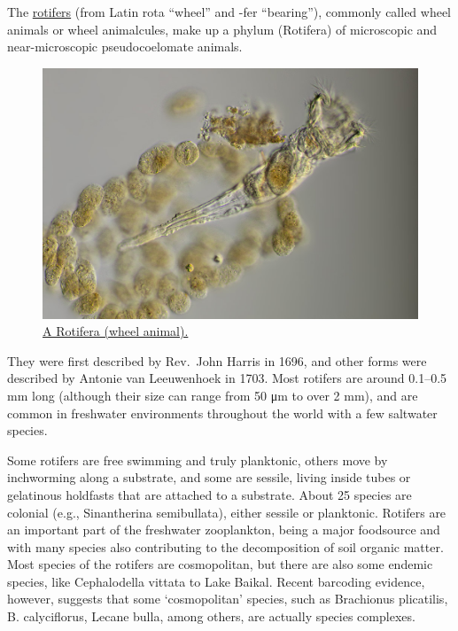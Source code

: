 The \href{https://en.wikipedia.org/wiki/Rotifer}{rotifers} (from Latin rota ``wheel'' and -fer ``bearing''), commonly called wheel animals or wheel animalcules, make up a phylum (Rotifera) of microscopic and near-microscopic pseudocoelomate animals.



\begin{figure}

{\centering \includegraphics[width=0.7\linewidth]{./figures/animals/Mikrofoto.de-Raedertier_Ptygura_pilula_2} 

}

\caption{\href{https://commons.wikimedia.org/wiki/File:Mikrofoto.de-Raedertier_Ptygura_pilula_2.jpg}{A Rotifera (wheel animal).}}\label{fig:rotifera}
\end{figure}

They were first described by Rev.~John Harris in 1696, and other forms were described by Antonie van Leeuwenhoek in 1703. Most rotifers are around 0.1--0.5 mm long (although their size can range from 50 μm to over 2 mm), and are common in freshwater environments throughout the world with a few saltwater species.

Some rotifers are free swimming and truly planktonic, others move by inchworming along a substrate, and some are sessile, living inside tubes or gelatinous holdfasts that are attached to a substrate. About 25 species are colonial (e.g., Sinantherina semibullata), either sessile or planktonic. Rotifers are an important part of the freshwater zooplankton, being a major foodsource and with many species also contributing to the decomposition of soil organic matter. Most species of the rotifers are cosmopolitan, but there are also some endemic species, like Cephalodella vittata to Lake Baikal. Recent barcoding evidence, however, suggests that some `cosmopolitan' species, such as Brachionus plicatilis, B. calyciflorus, Lecane bulla, among others, are actually species complexes.

